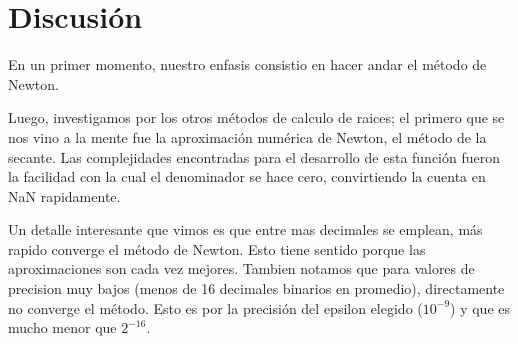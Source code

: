 \section{Discusi\'on}

En un primer momento, nuestro enfasis consistio en hacer andar el m\'etodo de Newton.


Luego, investigamos por los otros m\'etodos de calculo de raices; el primero que se nos vino a la mente
fue la aproximaci\'on num\'erica de Newton, el m\'etodo de la secante.
Las complejidades encontradas para el desarrollo de esta funci\'on fueron la facilidad con la cual
el denominador se hace cero, convirtiendo la cuenta en NaN rapidamente.


Un detalle interesante que vimos es que entre mas decimales se emplean, m\'as rapido converge el m\'etodo de Newton. Esto tiene sentido porque las aproximaciones son cada vez mejores. Tambien notamos que para valores de precision muy bajos (menos de 16 decimales binarios en promedio), directamente no converge el m\'etodo. Esto es por la precisi\'on del epsilon elegido ($10^{-9}$) y que es mucho menor que $2^{-16}$.